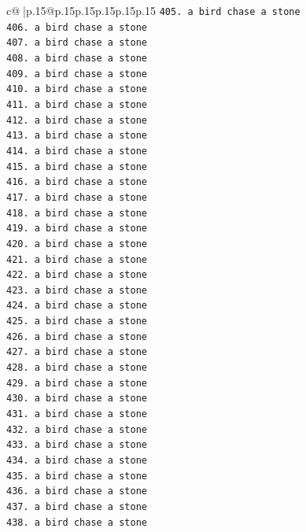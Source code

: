 \documentclass{article}
\begin{document}
{\begin{supertabular}{c@{$\;$}|p{.15\linewidth}@{}p{.15\linewidth}p{.15\linewidth}p{.15\linewidth}p{.15\linewidth}p{.15\linewidth}}
{{{\texttt{405. a bird chase a stone} \\
\texttt{406. a bird chase a stone} \\
\texttt{407. a bird chase a stone} \\
\texttt{408. a bird chase a stone} \\
\texttt{409. a bird chase a stone} \\
\texttt{410. a bird chase a stone} \\
\texttt{411. a bird chase a stone} \\
\texttt{412. a bird chase a stone} \\
\texttt{413. a bird chase a stone} \\
\texttt{414. a bird chase a stone} \\
\texttt{415. a bird chase a stone} \\
\texttt{416. a bird chase a stone} \\
\texttt{417. a bird chase a stone} \\
\texttt{418. a bird chase a stone} \\
\texttt{419. a bird chase a stone} \\
\texttt{420. a bird chase a stone} \\
\texttt{421. a bird chase a stone} \\
\texttt{422. a bird chase a stone} \\
\texttt{423. a bird chase a stone} \\
\texttt{424. a bird chase a stone} \\
\texttt{425. a bird chase a stone} \\
\texttt{426. a bird chase a stone} \\
\texttt{427. a bird chase a stone} \\
\texttt{428. a bird chase a stone} \\
\texttt{429. a bird chase a stone} \\
\texttt{430. a bird chase a stone} \\
\texttt{431. a bird chase a stone} \\
\texttt{432. a bird chase a stone} \\
\texttt{433. a bird chase a stone} \\
\texttt{434. a bird chase a stone} \\
\texttt{435. a bird chase a stone} \\
\texttt{436. a bird chase a stone} \\
\texttt{437. a bird chase a stone} \\
\texttt{438. a bird chase a stone} \\
}}}
\end{supertabular}}
\end{document}
